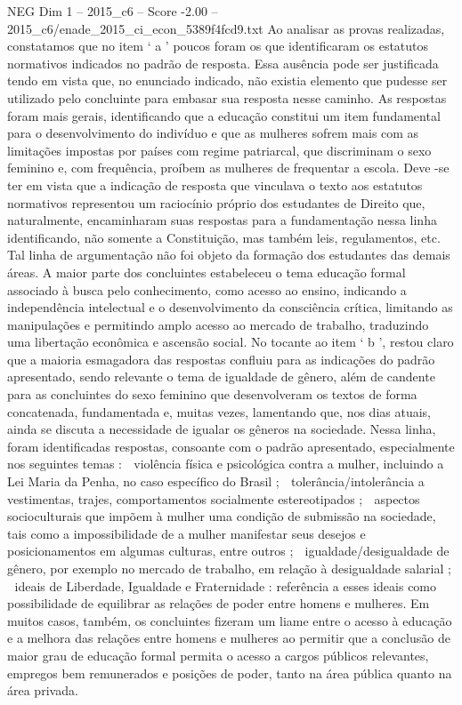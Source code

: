 \begin{textsample}{NEG Dim 1 – 2015\_c6 – Score -2.00 – 2015\_c6/enade\_2015\_ci\_econ\_5389f4fcd9.txt}
Ao analisar as provas realizadas, constatamos que no item ‘ a ’ poucos foram os que identificaram os estatutos normativos indicados no padrão de resposta.
Essa ausência pode ser justificada tendo em vista que, no enunciado indicado, não existia elemento que pudesse ser utilizado pelo concluinte para embasar sua resposta nesse caminho.
As respostas foram mais gerais, identificando que a educação constitui um item fundamental para o desenvolvimento do indivíduo e que as mulheres sofrem mais com as limitações impostas por países com regime patriarcal, que discriminam o sexo feminino e, com frequência, proíbem as mulheres de frequentar a escola.
Deve -se ter em vista que a indicação de resposta que vinculava o texto aos estatutos normativos representou um raciocínio próprio dos estudantes de Direito que, naturalmente, encaminharam suas respostas para a fundamentação nessa linha identificando, não somente a Constituição, mas também leis, regulamentos, etc.
Tal linha de argumentação não foi objeto da formação dos estudantes das demais áreas.
A maior parte dos concluintes estabeleceu o tema educação formal associado à busca pelo conhecimento, como acesso ao ensino, indicando a independência intelectual e o desenvolvimento da consciência crítica, limitando as manipulações e permitindo amplo acesso ao mercado de trabalho, traduzindo uma libertação econômica e ascensão social.
No tocante ao item ‘ b ’, restou claro que a maioria esmagadora das respostas confluiu para as indicações do padrão apresentado, sendo relevante o tema de igualdade de gênero, além de candente para as concluintes do sexo feminino que desenvolveram os textos de forma concatenada, fundamentada e, muitas vezes, lamentando que, nos dias atuais, ainda se discuta a necessidade de igualar os gêneros na sociedade.
Nessa linha, foram identificadas respostas, consoante com o padrão apresentado, especialmente nos seguintes temas :  violência física e psicológica contra a mulher, incluindo a Lei Maria da Penha, no caso específico do Brasil ;  tolerância/intolerância a vestimentas, trajes, comportamentos socialmente estereotipados ;  aspectos socioculturais que impõem à mulher uma condição de submissão na sociedade, tais como a impossibilidade de a mulher manifestar seus desejos e posicionamentos em algumas culturas, entre outros ;  igualdade/desigualdade de gênero, por exemplo no mercado de trabalho, em relação à desigualdade salarial ;  ideais de Liberdade, Igualdade e Fraternidade : referência a esses ideais como possibilidade de equilibrar as relações de poder entre homens e mulheres.
Em muitos casos, também, os concluintes fizeram um liame entre o acesso à educação e a melhora das relações entre homens e mulheres ao permitir que a conclusão de maior grau de educação formal permita o acesso a cargos públicos relevantes, empregos bem remunerados e posições de poder, tanto na área pública quanto na área privada.

\end{textsample}
